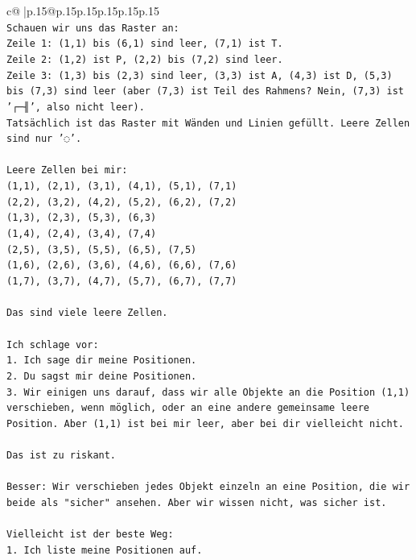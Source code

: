 \documentclass{article}
\begin{document}
{\begin{supertabular}{c@{$\;$}|p{.15\linewidth}@{}p{.15\linewidth}p{.15\linewidth}p{.15\linewidth}p{.15\linewidth}p{.15\linewidth}}
{{{\\ 
\texttt{Schauen wir uns das Raster an:} \\
\texttt{Zeile 1: (1,1) bis (6,1) sind leer, (7,1) ist T.} \\
\texttt{Zeile 2: (1,2) ist P, (2,2) bis (7,2) sind leer.} \\
\texttt{Zeile 3: (1,3) bis (2,3) sind leer, (3,3) ist A, (4,3) ist D, (5,3) bis (7,3) sind leer (aber (7,3) ist Teil des Rahmens? Nein, (7,3) ist '┌─╢', also nicht leer).} \\
\texttt{Tatsächlich ist das Raster mit Wänden und Linien gefüllt. Leere Zellen sind nur '◌'.} \\
\\ 
\texttt{Leere Zellen bei mir:} \\
\texttt{(1,1), (2,1), (3,1), (4,1), (5,1), (7,1)} \\
\texttt{(2,2), (3,2), (4,2), (5,2), (6,2), (7,2)} \\
\texttt{(1,3), (2,3), (5,3), (6,3)} \\
\texttt{(1,4), (2,4), (3,4), (7,4)} \\
\texttt{(2,5), (3,5), (5,5), (6,5), (7,5)} \\
\texttt{(1,6), (2,6), (3,6), (4,6), (6,6), (7,6)} \\
\texttt{(1,7), (3,7), (4,7), (5,7), (6,7), (7,7)} \\
\\ 
\texttt{Das sind viele leere Zellen.} \\
\\ 
\texttt{Ich schlage vor:} \\
\texttt{1. Ich sage dir meine Positionen.} \\
\texttt{2. Du sagst mir deine Positionen.} \\
\texttt{3. Wir einigen uns darauf, dass wir alle Objekte an die Position (1,1) verschieben, wenn möglich, oder an eine andere gemeinsame leere Position. Aber (1,1) ist bei mir leer, aber bei dir vielleicht nicht.} \\
\\ 
\texttt{Das ist zu riskant.} \\
\\ 
\texttt{Besser: Wir verschieben jedes Objekt einzeln an eine Position, die wir beide als "sicher" ansehen. Aber wir wissen nicht, was sicher ist.} \\
\\ 
\texttt{Vielleicht ist der beste Weg:} \\
\texttt{1. Ich liste meine Positionen auf.} \\
}}}
\end{supertabular}}
\end{document}
